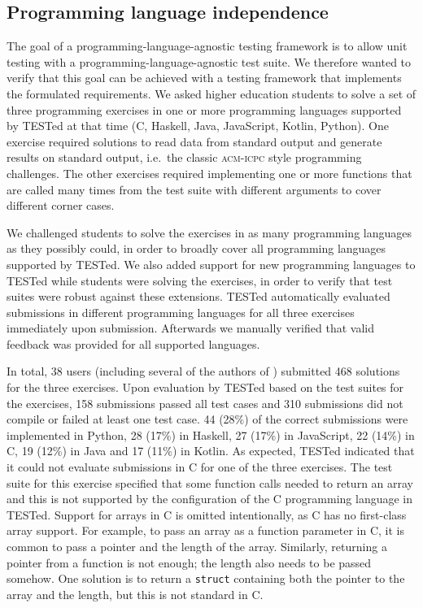 \documentclass[../main]{subfiles}
\begin{document}
\subsection{Programming language independence}\label{subsec:programming-language-independence}

The goal of a programming-language-agnostic testing framework is to allow unit testing with a programming-language-agnostic test suite.
We therefore wanted to verify that this goal can be achieved with a testing framework that implements the formulated requirements.
We asked higher education students to solve a set of three programming exercises in one or more programming languages supported by TESTed at that time (C, Haskell, Java, JavaScript, Kotlin, Python).
One exercise required solutions to read data from standard output and generate results on standard output, i.e.\ the classic \textsc{acm-icpc} style programming challenges.
The other exercises required implementing one or more functions that are called many times from the test suite with different arguments to cover different corner cases.

We challenged students to solve the exercises in as many programming languages as they possibly could, in order to broadly cover all programming languages supported by TESTed.
We also added support for new programming languages to TESTed while students were solving the exercises, in order to verify that test suites were robust against these extensions.
TESTed automatically evaluated submissions in different programming languages for all three exercises immediately upon submission.
Afterwards we manually verified that valid feedback was provided for all supported languages.

In total, 38 users (including several of the authors of \textcite{strijbolTESTedEducationalTesting2023}) submitted 468 solutions for the three exercises.
Upon evaluation by TESTed based on the test suites for the exercises, 158 submissions passed all test cases and 310 submissions did not compile or failed at least one test case.
44 (28\%) of the correct submissions were implemented in Python, 28 (17\%) in Haskell, 27 (17\%) in JavaScript, 22 (14\%) in C, 19 (12\%) in Java and 17 (11\%) in Kotlin.
As expected, TESTed indicated that it could not evaluate submissions in C for one of the three exercises.
The test suite for this exercise specified that some function calls needed to return an array and this is not supported by the configuration of the C programming language in TESTed.
Support for arrays in C is omitted intentionally, as C has no first-class array support.
For example, to pass an array as a function parameter in C, it is common to pass a pointer and the length of the array.
Similarly, returning a pointer from a function is not enough;
the length also needs to be passed somehow.
One solution is to return a \texttt{struct} containing both the pointer to the array and the length, but this is not standard in C\@.
\end{document}
